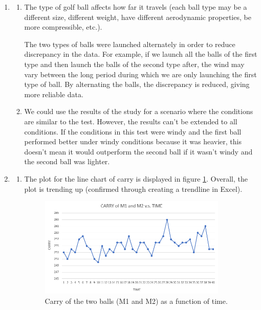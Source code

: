 \documentclass[11pt, letterpaper, titlepage]{article}
\title{\textbf{\Huge{
\begin{center}
    STAT 235\\ 
    Lab 1\\
\end{center}
}}}
\author{
    Name: \B enjamin Kong\\
    ID: 1573684\\
}
\begin{document}
 
\doublespacing
\maketitle

\begin{enumerate}
    \item \begin{enumerate}[parsep=0.4cm]
        \item The type of golf ball affects how far it travels (each ball type may be a different size, different weight, have different aerodynamic properties, be more compressible, etc.). 
        
        The two types of balls were launched alternately in order to reduce discrepancy in the data. For example, if we launch all the balls of the first type and then launch the balls of the second type after, the wind may vary between the long period during which we are only launching the first type of ball. By alternating the balls, the discrepancy is reduced, giving more reliable data.

        \item We could use the results of the study for a scenario where the conditions are similar to the test. However, the results can't be extended to all conditions. If the conditions in this test were windy and the first ball performed better under windy conditions because it was heavier, this doesn't mean it would outperform the second ball if it wasn't windy and the second ball was lighter.
    \end{enumerate}

    \item \begin{enumerate}
        \item The plot for the line chart of carry is displayed in figure \ref{2a}. Overall, the plot is trending up (confirmed through creating a trendline in Excel).
        
        \begin{figure}
            \centering
            \includegraphics[width=0.9\textwidth]{2a.PNG}
            \caption{Carry of the two balls (M1 and M2) as a function of time.}
            \label{2a}
        \end{figure}


\end{enumerate}
\end{enumerate}
\end{document}
